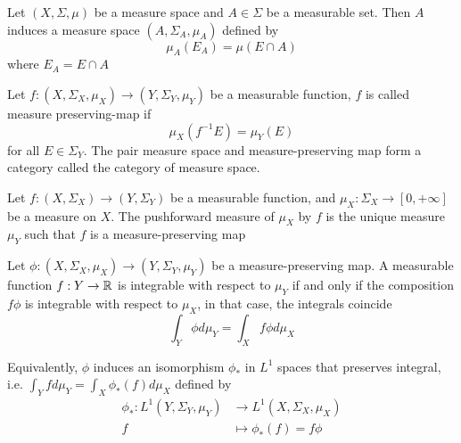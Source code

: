 \documentclass{report}
\begin{document}
\begin{definition}[subspace]
    Let $(X, \Sigma, \mu)$ be a measure space and $A \in \Sigma$ be a measurable set. Then $A$ induces a measure space $(A, \Sigma_A, \mu_A)$ defined by
    $$
        \mu_A(E_A) = \mu(E \cap A)
    $$
    where $E_A = E \cap A$
\end{definition}


\begin{definition}
    Let $f: (X, \Sigma_X, \mu_X) \to (Y, \Sigma_Y, \mu_Y)$ be a measurable function, $f$ is called measure preserving-map if
    $$
        \mu_X(f^{-1} E) = \mu_Y (E)
    $$
    for all $E \in \Sigma_Y$. The pair measure space and measure-preserving map form a category called the category of measure space.
\end{definition}

\begin{definition}
    Let $f: (X, \Sigma_X) \to (Y, \Sigma_Y)$ be a measurable function, and $\mu_X: \Sigma_X \to [0, +\infty]$ be a measure on $X$. The pushforward measure of $\mu_X$ by $f$ is the unique measure $\mu_Y$ such that $f$ is a measure-preserving map
\end{definition}

\begin{theorem}
    Let $\phi: (X, \Sigma_X, \mu_X) \to (Y, \Sigma_Y, \mu_Y)$ be a measure-preserving map. A measurable function $f: Y \to \mathbb{R}$ is integrable with respect to $\mu_Y$ if and only if the composition $f \phi$ is integrable with respect to $\mu_X$, in that case, the integrals coincide
    $$
        \int_Y \phi d\mu_Y = \int_X f \phi d\mu_X
    $$
    \begin{center}
    \end{center}
    Equivalently, $\phi$ induces an isomorphism $\phi_*$ in $L^1$ spaces that preserves integral, i.e. $\int_Y f d\mu_Y = \int_X \phi_*(f) d\mu_X$ defined by
    \begin{align*}
        \phi_*: L^1(Y, \Sigma_Y, \mu_Y) &\to L^1(X, \Sigma_X, \mu_X) \\
        f &\mapsto \phi_*(f) = f \phi
    \end{align*}
\end{theorem}
 
\end{document}
